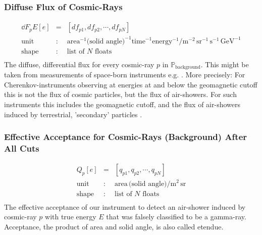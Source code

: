 \documentclass{article}%
\begin{document}
        \subsubsection*{Diffuse Flux of Cosmic-Rays}
            \begin{eqnarray*}
                \dd{F_p}{E}[e] &=& [df_{p1}, df_{p2}, \cdots, df_{pN}]\\
                \text{unit} &:& \text{area}^{-1} \text{(solid angle)}^{-1} \text{time}^{-1} \text{energy}^{-1} / \text{m}^{-2}\, \text{sr}^{-1}\,\text{s}^{-1}\,\text{GeV}^{-1}\\
                \text{shape} &:& \text{list of}\,\,N\,\,\text{floats}\\
            \end{eqnarray*}
            The diffuse, differential flux for every cosmic-ray $p$ in $\mathbb{P}_\text{background}$. This might be taken from measurements of space-born instruments e.g. \cite{aguilar2014precision,aguilar2015precision}.
            More precisely: For Cherenkov-instruments observing at energies at and below the geomagnetic cutoff this is not the flux of cosmic particles, but the flux of air-showers.
            For such instruments this includes the geomagnetic cutoff, and the flux of air-showers induced by terrestrial, 'secondary' particles \cite{lipari2002fluxes}.
        \subsubsection*{Effective Acceptance for Cosmic-Rays (Background) After All Cuts}
            \begin{eqnarray*}
                Q_p[e] &=& [q_{p1}, q_{p2}, \cdots, q_{pN}]\\
                \text{unit} &:& \text{area} \, \text{(solid angle)} / \text{m}^{2}\,\text{sr}\\
                \text{shape} &:& \text{list of}\,\,N\,\,\text{floats}\\
            \end{eqnarray*}
            The effective acceptance of our instrument to detect an air-shower induced by cosmic-ray $p$ with true energy $E$ that was falsely classified to be a gamma-ray.
            Acceptance, the product of area and solid angle, is also called etendue.
\end{document}
